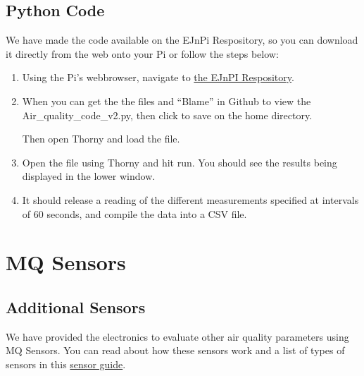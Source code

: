 \documentclass{article}
\begin{document}
\subsection{Python Code}

We have made the code available on the EJnPi Respository, so you can download it directly from the web onto your Pi or follow the steps below:

\begin{enumerate}

\item Using the Pi's webbrowser, navigate to \href{https://github.com/marclos/EJnPi/tree/master/code}{the EJnPI Respository}. 

\item When you can get the the files and ``Blame'' in Github to view the Air\_quality\_code\_v2.py, then click to save on the home directory.

Then open Thorny and load the file.



\item Open the file using Thorny and hit run. You should see the results being displayed in the lower window.



\item It should release a reading of the different measurements specified at intervals of 60 seconds, and compile the data into a CSV file.

\end{enumerate}
\clearpage

\section{MQ Sensors}

\subsection{Additional Sensors}

We have provided the electronics to evaluate other air quality parameters using MQ Sensors. You can read about how these sensors work and a list of types of sensors in this \href{http://github...}{sensor guide}.
\end{document}
